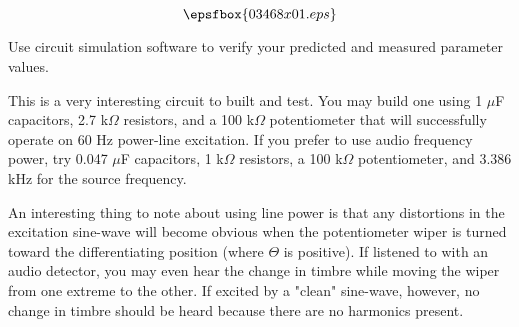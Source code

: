 

$$\epsfbox{03468x01.eps}$$

\vfil \eject






Use circuit simulation software to verify your predicted and measured parameter values.







This is a very interesting circuit to built and test.  You may build one using 1 $\mu$F capacitors, 2.7 k$\Omega$ resistors, and a 100 k$\Omega$ potentiometer that will successfully operate on 60 Hz power-line excitation.  If you prefer to use audio frequency power, try 0.047 $\mu$F capacitors, 1 k$\Omega$ resistors, a 100 k$\Omega$ potentiometer, and 3.386 kHz for the source frequency.

An interesting thing to note about using line power is that any distortions in the excitation sine-wave will become obvious when the potentiometer wiper is turned toward the differentiating position (where $\Theta$ is positive).  If listened to with an audio detector, you may even hear the change in timbre while moving the wiper from one extreme to the other.  If excited by a "clean" sine-wave, however, no change in timbre should be heard because there are no harmonics present.




